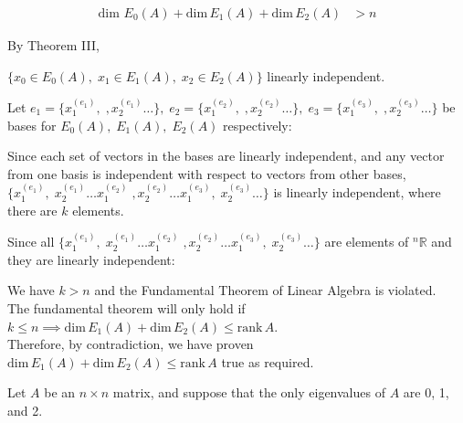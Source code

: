 \documentclass[10pt]{article}
\newcommand{\noin}{\noindent}
\begin{document}
{{\begin{spacing}{1.5}
\begin{center}
\begin{align*}
                \text{dim }E_0(A) + \mathrm{dim}\, E_1(A) + \mathrm{dim}\, E_2(A) &> n
            \end{align*}
        \end{center}
        \vspace{5pt}
        By Theorem III,
        \vspace{-6pt}
        \begin{center}
                $\big\{x_0\in E_0(A),\;x_1\in E_1(A),\;x_2\in E_2(A)\big\}$ linearly independent.
        \end{center}
        Let $e_1=\{x^{(e_1)}_1,\;,x^{(e_1)}_2\dots\},\;e_2=\{x^{(e_2)}_1,\;,x^{(e_2)}_2\dots\},\;e_3=\{x^{(e_3)}_1,\;,x^{(e_3)}_2\dots\}$ be bases for $E_0(A),\;E_1(A),\;E_2(A)$ respectively:
        \vspace{-6pt}
        \begin{center}
            Since each set of vectors in the bases are linearly independent, and any vector from one basis is independent with respect to vectors from other bases,\\
            $\{x^{(e_1)}_1,\;x^{(e_1)}_2\dots x^{(e_2)}_1\;,x^{(e_2)}_2\dots x^{(e_3)}_1,\;x^{(e_3)}_2\dots\}$ is linearly independent, where there are $k$ elements.
        \end{center}
        \vspace{6pt}
        Since all $\{x^{(e_1)}_1,\;x^{(e_1)}_2\dots x^{(e_2)}_1\;,x^{(e_2)}_2\dots x^{(e_3)}_1,\;x^{(e_3)}_2\dots\}$ are elements of $^n\mathbb{R}$ and they are linearly independent:
        \vspace{-6pt}
        \begin{center}
            We have $k>n$ and the Fundamental Theorem of Linear Algebra is violated.\\
            The fundamental theorem will only hold if $k\leq n\implies\mathrm{dim}\, E_1(A) + \mathrm{dim}\, E_2(A) \leq \mathrm{rank}\, A$.\\
            \vspace{20pt}
            Therefore, by contradiction, we have proven $\mathrm{dim}\, E_1(A) + \mathrm{dim}\, E_2(A) \leq \mathrm{rank}\, A$ true as required.
        \end{center}
    \end{spacing}
	}
}


\pagebreak

\noin{\bf 2.}    Let $A$ be an $n\times n$ matrix, and suppose that the only eigenvalues of $A$ are 0, 1, and 2.

\vspace{20pt}
\end{document}
